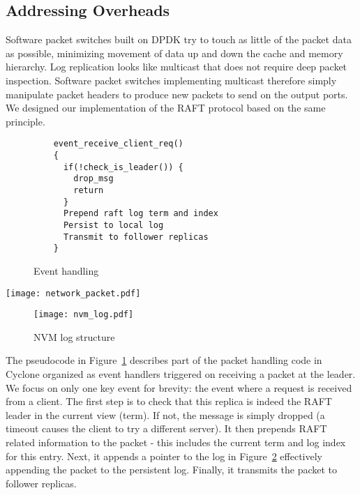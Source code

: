 \documentclass[twocolumn]{article}
\begin{document}
\subsection{Addressing Overheads}
\label{sec:dm}
Software packet switches built on DPDK try to touch as little of the packet data
as possible, minimizing movement of data up and down the cache and memory
hierarchy. Log replication looks like multicast that does not require deep
packet inspection. Software packet switches implementing multicast therefore
simply manipulate packet headers to produce new packets to send on the output
ports. We designed our implementation of the RAFT protocol based on the same
principle.

\begin{figure}
\small
\begin{verbatim}
    event_receive_client_req()
    {
      if(!check_is_leader()) {
        drop_msg
        return
      }
      Prepend raft log term and index
      Persist to local log
      Transmit to follower replicas
    }
\end{verbatim}
\caption{Event handling}
\label{fig:control_plane}
\end{figure}

\begin{figure*}
  \centering
  \texttt{[image: network\_packet.pdf]}
  \caption{Cyclone network packet layout}
  \label{fig:packet_layout}
\end{figure*}

\begin{figure}
\centering
\texttt{[image: nvm\_log.pdf]}
\caption{NVM log structure}
\label{fig:nvm_log}
\end{figure}


The pseudocode in Figure~\ref{fig:control_plane} describes part of the packet
handling code in Cyclone organized as event handlers triggered on receiving a
packet at the leader. We focus on only one key event for brevity: the event
where a request is received from a client. The first step is to check that this
replica is indeed the RAFT leader in the current view (term). If not, the
message is simply dropped (a timeout causes the client to try a different
server). It then prepends RAFT related information to the packet - this includes
the current term and log index for this entry. Next, it appends a pointer to the
log in Figure~\ref{fig:nvm_log} effectively appending the packet to the
persistent log. Finally, it transmits the packet to follower replicas.
\end{document}
